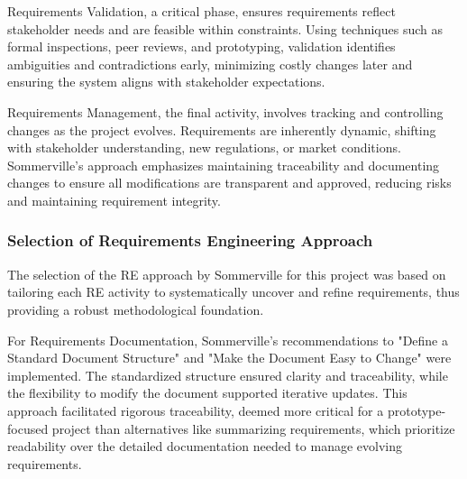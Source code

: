 Requirements Validation, a critical phase, ensures requirements reflect stakeholder needs and are feasible within
constraints. Using techniques such as formal inspections, peer reviews, and prototyping, validation identifies
ambiguities and contradictions early, minimizing costly changes later and ensuring the system aligns with stakeholder
expectations.\autocite[cf.][p.190--191]{sommervilleRequirementsEngineeringGood1997}

Requirements Management, the final activity, involves tracking and controlling changes as the project evolves.
Requirements are inherently dynamic, shifting with stakeholder understanding, new regulations, or market conditions.
Sommerville’s approach emphasizes maintaining traceability and documenting changes to ensure all modifications are
transparent and approved, reducing risks and maintaining requirement integrity.\autocite[cf.][p.216--217]{sommervilleRequirementsEngineeringGood1997}

\subsubsection{Selection of Requirements Engineering Approach}

The selection of the \acs{RE} approach by Sommerville for this project was based on
tailoring each \acs{RE} activity to systematically uncover and refine requirements, thus providing a robust methodological
foundation.

For Requirements Documentation, Sommerville’s recommendations to "Define a Standard Document Structure" and "Make the
Document Easy to Change" were implemented. The standardized structure ensured clarity and traceability, while the
flexibility to modify the document supported iterative updates.\autocite[cf.][p.41]{sommervilleRequirementsEngineeringGood1997}
\autocite[cf.][p.60]{sommervilleRequirementsEngineeringGood1997} This approach facilitated rigorous traceability, deemed
more critical for a prototype-focused project than alternatives like summarizing requirements, which prioritize
readability over the detailed documentation needed to manage evolving requirements.\autocite[cf.][p.47]{sommervilleRequirementsEngineeringGood1997}

